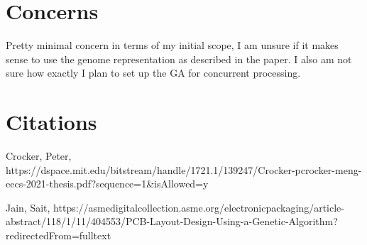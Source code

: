 \documentclass{article}
\begin{document}
\section{Concerns}
Pretty minimal concern in terms of my initial scope, I am unsure if it makes sense to use the genome representation as described in the paper. I also am not sure how exactly I plan to set up the GA for concurrent processing. 
\pagebreak
\section{Citations}

Crocker, Peter, https://dspace.mit.edu/bitstream/handle/1721.1/139247/Crocker-pcrocker-meng-eecs-2021-thesis.pdf?sequence=1&isAllowed=y 

Jain, Sait, https://asmedigitalcollection.asme.org/electronicpackaging/article-abstract/118/1/11/404553/PCB-Layout-Design-Using-a-Genetic-Algorithm?redirectedFrom=fulltext
\end{document}
